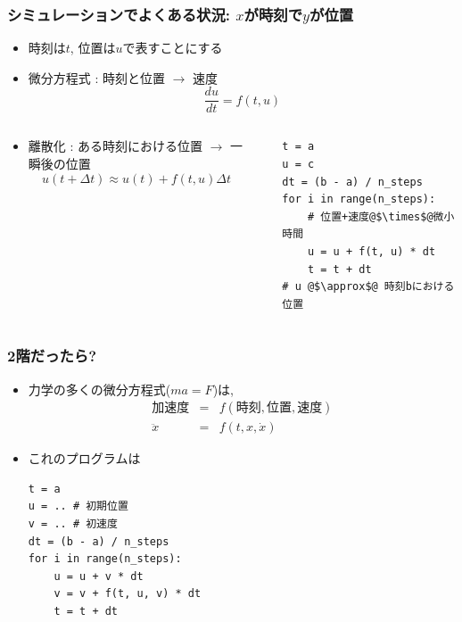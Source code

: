 \documentclass[12pt,dvipdfmx]{beamer}
\begin{document}
\begin{frame}[fragile]
  \frametitle{シミュレーションでよくある状況: $x$が時刻で$y$が位置}
\begin{itemize}
\item 時刻は$t$, 位置は$u$で表すことにする

\item 微分方程式 : 時刻と位置 $\rightarrow$ 速度
  \[ \frac{du}{dt} = f(t, u) \]
\end{itemize}
\begin{columns}
    \begin{column}{0.45\textwidth}
\begin{itemize}
\item 離散化 : ある時刻における位置 $\rightarrow$ 一瞬後の位置
  \[ u(t + \Delta t) \approx u(t) + f(t, u) \Delta t \]
\end{itemize}
\end{column}
\begin{column}{0.1\textwidth}
\end{column}
\hspace{5mm}
    \begin{column}{0.6\textwidth}
\begin{lstlisting}
t = a
u = c
dt = (b - a) / n_steps
for i in range(n_steps):
    # 位置+速度@$\times$@微小時間
    u = u + f(t, u) * dt
    t = t + dt
# u @$\approx$@ 時刻bにおける位置    
\end{lstlisting}
\end{column}

  \end{columns}
\end{frame}

\begin{frame}[fragile]
\frametitle{2階だったら?}
\begin{itemize}
\item 力学の多くの微分方程式($ma = F$)は,
\begin{eqnarray*}
\mbox{加速度} & = & f(\mbox{時刻}, \mbox{位置}, \mbox{速度}) \\
\ddot{x} & = & f(t, x, \dot{x})
\end{eqnarray*}

\item これのプログラムは
\begin{lstlisting}
t = a
u = .. # 初期位置
v = .. # 初速度
dt = (b - a) / n_steps
for i in range(n_steps):
    u = u + v * dt
    v = v + f(t, u, v) * dt
    t = t + dt
\end{lstlisting}
\end{itemize}
\end{frame}
\end{document}

